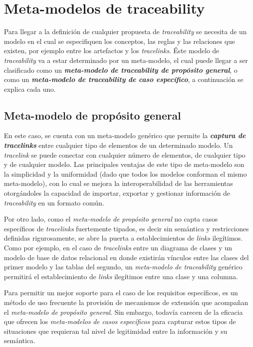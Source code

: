 \documentclass[a4paper,12pt,oneside,spanish]{book}
\begin{document}
\section{Meta-modelos de traceability}

Para llegar a la definición de cualquier propuesta de \textit{traceability} se necesita de un modelo en el cual se especifiquen los conceptos, las reglas y las relaciones que existen, por ejemplo entre los artefactos y los \textit{tracelinks}. Éste modelo de \textit{traceability} va a estar determinado por un meta-modelo, el cual puede llegar a ser clasificado como un \textit{\textbf{meta-modelo de traceability de propósito general}}, o como un \textit{\textbf{meta-modelo de traceability de caso específico}}, a continuación se explica cada uno.

\subsection{Meta-modelo de propósito general}
\label{subsec:MetaModeloPropositoGeneral}

En este caso, se cuenta con un meta-modelo genérico que permite la \textit{\textbf{captura de tracelinks}} entre cualquier tipo de elementos de un determinado modelo. Un \textit{tracelink} se puede conectar con cualquier número de elementos, de cualquier tipo y de cualquier modelo. Las principales ventajas de este tipo de meta-modelo son la simplicidad y la uniformidad (dado que todos los modelos conforman el mismo meta-modelo), con lo cual se mejora la interoperabilidad de las herramientas otorgándoles la capacidad de importar, exportar y gestionar información de \textit{traceability} en un formato común.

Por otro lado, como el \textit{meta-modelo de propósito general} no capta casos específicos de \textit{tracelinks} fuertemente tipados, es decir sin semántica y restricciones definidas rigurosamente, se abre la puerta a establecimientos de \textit{links} ilegítimos. Como por ejemplo, en el caso de \textit{tracelinks} entre un diagrama de clases y un modelo de base de datos relacional en donde existirán vínculos entre las clases del primer modelo y las tablas del segundo, un \textit{meta-modelo de traceability} genérico permitirá el establecimiento de \textit{links} ilegítimos entre una clase y una columna.

Para permitir un mejor soporte para el caso de los requisitos específicos, es un método de uso frecuente la provisión de mecanismos de extensión que acompañan el \textit{meta-modelo de propósito general}. Sin embargo, todavía carecen de la eficacia que ofrecen los \textit{meta-modelos de casos específicos} para capturar estos tipos de situaciones que requieran tal nivel de legitimidad entre la información y su semántica.
\end{document}
